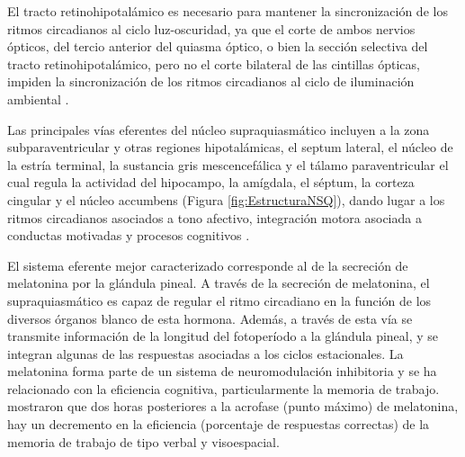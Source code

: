 \documentclass[12pt,letterpaper,final]{article}
\let\cite\cite %
\begin{document}
El tracto retinohipotalámico es necesario para mantener la sincronización de los ritmos circadianos al ciclo luz-oscuridad, ya que el corte de ambos nervios ópticos, del tercio anterior del quiasma óptico, o bien la sección selectiva del tracto retinohipotalámico, pero no el corte bilateral de las cintillas ópticas, impiden la sincronización de los ritmos circadianos al ciclo de iluminación ambiental \cite{Johnson1988,Moore1974}.

Las principales vías eferentes del núcleo supraquiasmático incluyen a la zona subparaventricular y otras regiones hipotalámicas, el septum lateral, el núcleo de la estría terminal,  la sustancia gris mescencefálica y el tálamo paraventricular el cual regula la actividad del hipocampo, la amígdala, el séptum, la corteza cingular y el núcleo accumbens (Figura \ref{fig:EstructuraNSQ}), dando lugar a los ritmos circadianos asociados a tono afectivo, integración motora asociada a conductas motivadas y procesos cognitivos \cite{Berk1981}.

El sistema eferente mejor caracterizado corresponde al de la secreción de melatonina por la glándula pineal. A través de la secreción de melatonina, el supraquiasmático es capaz de regular el ritmo circadiano en la función de los diversos órganos blanco de esta hormona. Además, a través de esta vía se transmite información de la longitud del fotoperíodo a la glándula pineal, y se integran algunas de las respuestas asociadas a los ciclos estacionales. La melatonina forma parte de un sistema de neuromodulación inhibitoria y se ha relacionado con la eficiencia cognitiva, particularmente la memoria de trabajo.   mostraron que dos horas posteriores a la acrofase (punto máximo) de melatonina, hay un decremento en la eficiencia (porcentaje de respuestas correctas) de la memoria de trabajo de tipo verbal y visoespacial.
\end{document}
